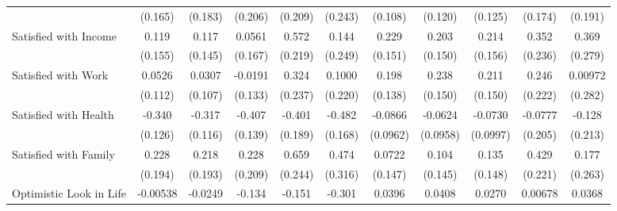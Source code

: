 {\begin{tabular}{l*{10}{c}}
            &     (0.165)         &     (0.183)         &     (0.206)         &     (0.209)         &     (0.243)         &     (0.108)         &     (0.120)         &     (0.125)         &     (0.174)         &     (0.191)         \\
\addlinespace
Satisfied with Income&       0.119         &       0.117         &      0.0561         &       0.572\sym{**} &       0.144         &       0.229         &       0.203         &       0.214         &       0.352         &       0.369         \\
            &     (0.155)         &     (0.145)         &     (0.167)         &     (0.219)         &     (0.249)         &     (0.151)         &     (0.150)         &     (0.156)         &     (0.236)         &     (0.279)         \\
\addlinespace
Satisfied with Work&      0.0526         &      0.0307         &     -0.0191         &       0.324         &      0.1000         &       0.198         &       0.238         &       0.211         &       0.246         &     0.00972         \\
            &     (0.112)         &     (0.107)         &     (0.133)         &     (0.237)         &     (0.220)         &     (0.138)         &     (0.150)         &     (0.150)         &     (0.222)         &     (0.282)         \\
\addlinespace
Satisfied with Health&      -0.340\sym{**} &      -0.317\sym{**} &      -0.407\sym{**} &      -0.401\sym{*}  &      -0.482\sym{**} &     -0.0866         &     -0.0624         &     -0.0730         &     -0.0777         &      -0.128         \\
            &     (0.126)         &     (0.116)         &     (0.139)         &     (0.189)         &     (0.168)         &    (0.0962)         &    (0.0958)         &    (0.0997)         &     (0.205)         &     (0.213)         \\
\addlinespace
Satisfied with Family&       0.228         &       0.218         &       0.228         &       0.659\sym{**} &       0.474         &      0.0722         &       0.104         &       0.135         &       0.429         &       0.177         \\
            &     (0.194)         &     (0.193)         &     (0.209)         &     (0.244)         &     (0.316)         &     (0.147)         &     (0.145)         &     (0.148)         &     (0.221)         &     (0.263)         \\
\addlinespace
Optimistic Look in Life&    -0.00538         &     -0.0249         &      -0.134         &      -0.151         &      -0.301\sym{*}  &      0.0396         &      0.0408         &      0.0270         &     0.00678         &      0.0368         \\

\end{tabular}}
